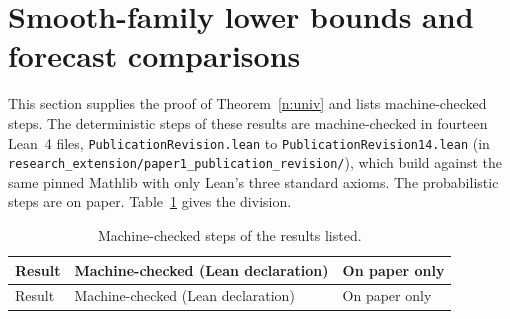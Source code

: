 \documentclass[12pt]{article}
\theoremstyle{definition}
\theoremstyle{remark}
\begin{document}
\section{Smooth-family lower bounds and forecast comparisons}\label{app:univirr}

This section supplies the proof of Theorem~\ref{n:univ} and lists machine-checked steps. The deterministic steps of these results are machine-checked in fourteen Lean~4 files, \nolinkurl{PublicationRevision.lean} to \nolinkurl{PublicationRevision14.lean} (in \nolinkurl{research_extension/paper1_publication_revision/}), which build against the same pinned Mathlib with only Lean's three standard axioms. The probabilistic steps are on paper. Table~\ref{tab:newlean} gives the division.
{\footnotesize
\begin{longtable}{>{\raggedright\arraybackslash}p{}>{\raggedright\arraybackslash}p{}>{\raggedright\arraybackslash}p{}}
\caption{Machine-checked steps of the results listed.}\label{tab:newlean}\\
\toprule
Result & Machine-checked (Lean declaration) & On paper only\\\midrule
\endfirsthead
\toprule
Result & Machine-checked (Lean declaration) & On paper only\\\midrule
\endhead


\end{longtable}}
\end{document}
